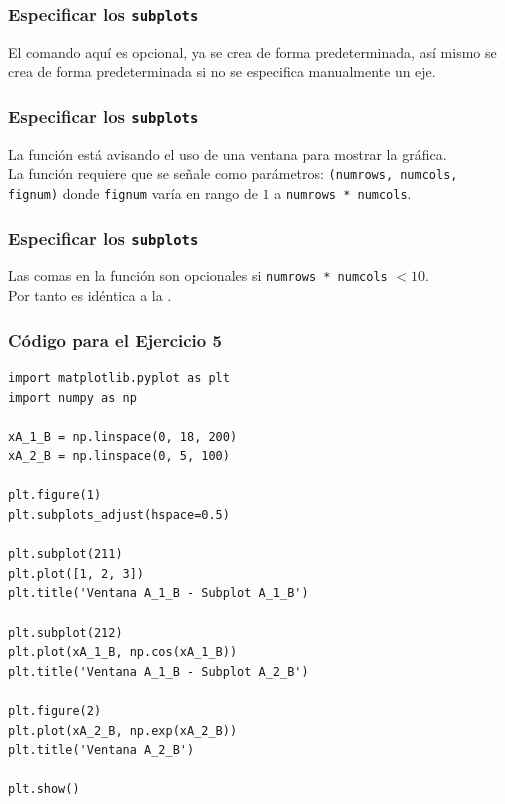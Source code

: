 \begin{frame}
\frametitle{Especificar los \texttt{subplots}}
El comando  aquí es opcional, ya  se crea de forma predeterminada, así mismo  se crea de forma predeterminada si no se especifica manualmente un eje.
\end{frame}
\begin{frame}
\frametitle{Especificar los \texttt{subplots}}
La función  está avisando el uso de una ventana para mostrar la gráfica.
\\
\bigskip
La función  requiere que se señale como parámetros: \texttt{(numrows, numcols, fignum)} donde \texttt{fignum} varía en rango de $1$ a \texttt{numrows * numcols}.
\end{frame}
\begin{frame}
\frametitle{Especificar los \texttt{subplots}}
Las comas en la función  son opcionales si \texttt{numrows * numcols} $<10$. 
\\
\bigskip
Por tanto  es idéntica a la .
\end{frame}
\begin{frame}
\frametitle{Código para el Ejercicio 5}
\begin{lstlisting}[style=codigopython]
import matplotlib.pyplot as plt
import numpy as np

xA_1_B = np.linspace(0, 18, 200)
xA_2_B = np.linspace(0, 5, 100)

plt.figure(1)                
plt.subplots_adjust(hspace=0.5)

plt.subplot(211)        
plt.plot([1, 2, 3])
plt.title('Ventana A_1_B - Subplot A_1_B')

plt.subplot(212)         
plt.plot(xA_1_B, np.cos(xA_1_B))
plt.title('Ventana A_1_B - Subplot A_2_B')

plt.figure(2)                
plt.plot(xA_2_B, np.exp(xA_2_B))           
plt.title('Ventana A_2_B')

plt.show()
\end{lstlisting}
\end{frame}
